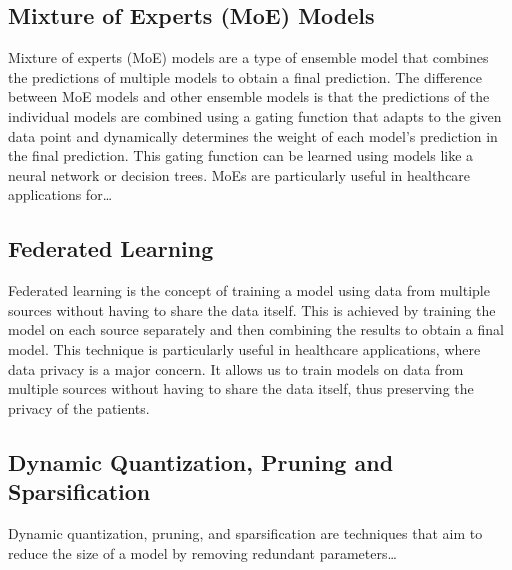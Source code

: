 \documentclass[../main.tex]{subfiles}
\begin{document}
    \subsection{Mixture of Experts (MoE) Models} \label{sec:mixture_of_experts}

    Mixture of experts (MoE) models are a type of ensemble model that combines the predictions of multiple models to obtain a final prediction. The difference between MoE models and other ensemble models is that the predictions of the individual models are combined using a gating function that adapts to the given data point and dynamically determines the weight of each model's prediction in the final prediction. This gating function can be learned using models like a neural network or decision trees. MoEs are particularly useful in healthcare applications for\dots


    \subsection{Federated Learning} \label{sec:federated_learning}

    Federated learning is the concept of training a model using data from multiple sources without having to share the data itself. This is achieved by training the model on each source separately and then combining the results to obtain a final model. This technique is particularly useful in healthcare applications, where data privacy is a major concern. It allows us to train models on data from multiple sources without having to share the data itself, thus preserving the privacy of the patients.

    \subsection{Dynamic Quantization, Pruning and Sparsification} \label{sec:dynamic_quantization_pruning_sparsification}

    Dynamic quantization, pruning, and sparsification are techniques that aim to reduce the size of a model by removing redundant parameters\dots


\end{document}
